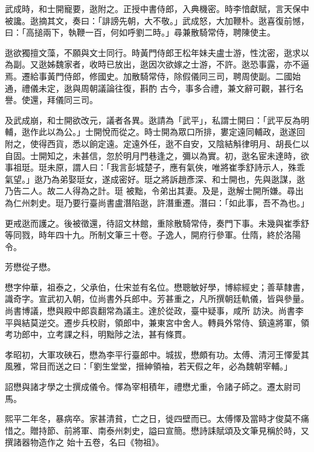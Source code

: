 \begin{pinyinscope}
 武成時，和士開寵要，逖附之。正授中書侍郎，入典機密。時李愔獻賦，言天保中被讒。逖摘其文，奏曰：「誹謗先朝，大不敬。」武成怒，大加鞭朴。逖喜復前憾，曰：「高搥兩下，執鞭一百，何如呼劉二時。」尋兼散騎常侍，聘陳使主。



 逖欲獨擅文藻，不願與文士同行。時黃門侍郎王松年妹夫盧士游，性沈密，逖求以為副。又逖姊魏家者，收時已放出，逖因次欲嫁之士游，不許。逖恐事露，亦不逼焉。遷給事黃門侍郎，修國史。加散騎常侍，除假儀同三司，聘周使副。二國始通，禮儀未定，逖與周朝議論往復，斟酌
 古今，事多合禮，兼文辭可觀，甚行名譽。使還，拜儀同三司。



 及武成崩，和士開欲改元，議者各異。逖請為「武平」，私謂士開曰：「武平反為明輔，逖作此以為公。」士開悅而從之。時士開為眾口所排，婁定遠同輔政，逖遂回附之，使得西貨，悉以餉定遠。定遠外任，逖不自安，又陰結斛律明月、胡長仁以自固。士開知之，未甚信，忽於明月門巷逢之，彌以為實。初，逖名宦未達時，欲事祖珽。珽未原，謂人曰：「我言彭城楚子，應有氣俠，唯將崔季舒詩示人，殊乖氣望。」逖乃為弟娶珽女，遂成密好。珽之將訴趙彥深、和士開也，先與逖謀，逖乃告二人。故二人得為之計。珽
 被黜，令弟出其妻。及是，逖解士開所嫌。尋出為仁州刺史。珽乃要行臺尚書盧潛陷逖，許潛重遷。潛曰：「如此事，吾不為也。」



 更戒逖而護之。後被徵還，待詔文林館，重除散騎常侍，奏門下事。未幾與崔季舒等同戮，時年四十九。所制文筆三十卷。子逸人，開府行參軍。仕隋，終於洛陽令。



 芳懋從子懋。



 懋字仲華，祖泰之，父承伯，仕宋並有名位。懋聰敏好學，博綜經史；善草隸書，識奇字。宣武初入朝，位尚書外兵郎中。芳甚重之，凡所撰朝廷軌儀，皆與參量。尚書博議，懋與殿中郎袁翻常為議主。達於從政，臺中疑事，咸所
 訪決。尚書李平與結莫逆交。遷步兵校尉，領郎中，兼東宮中舍人。轉員外常侍、鎮遠將軍，領考功郎中，立考課之科，明黜陟之法，甚有條貫。



 孝昭初，大軍攻硤石，懋為李平行臺郎中。城拔，懋頗有功。太傅、清河王懌愛其風雅，常目而送之曰：「劉生堂堂，搢紳領袖，若天假之年，必為魏朝宰輔。」



 詔懋與諸才學之士撰成儀令。懌為宰相積年，禮懋尤重，令諸子師之。遷太尉司馬。



 熙平二年冬，暴病卒。家甚清貧，亡之日，徙四壁而已。太傅懌及當時才俊莫不痛惜之。贈持節、前將軍、南泰州刺史，謚曰宣簡。懋詩誄賦頌及文筆見稱於時，又撰諸器物造作之
 始十五卷，名曰《物祖》。




\end{pinyinscope}

